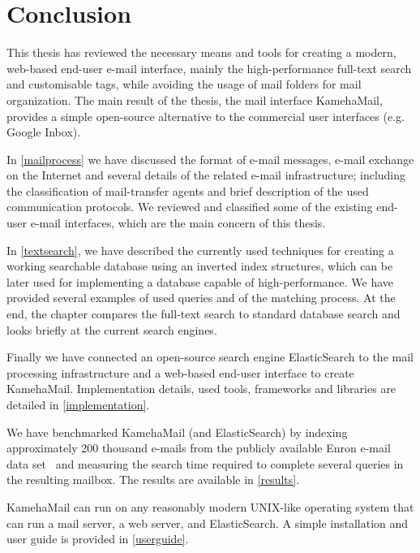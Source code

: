 \chapter*{Conclusion}
This thesis has reviewed the necessary means and tools for creating a modern, web-based end-user e-mail interface, mainly the high-performance full-text search and customisable tags, while avoiding the usage of mail folders for mail organization. The main result of the thesis, the mail interface KamehaMail, provides a simple open-source alternative to the commercial user interfaces (e.g. Google Inbox).

In \autoref{mailprocess} we have discussed the format of e-mail messages, e-mail exchange on the Internet and several details of the related e-mail infrastructure; including the classification of mail-transfer agents and brief description of the used communication protocols. We reviewed and classified some of the existing end-user e-mail interfaces, which are the main concern of this thesis.

In \autoref{textsearch}, we have described the currently used techniques for creating a working searchable database using an inverted index structures, which can be later used for implementing a database capable of high-performance. We have provided several examples of used queries and of the matching process. At the end, the chapter compares the full-text search to standard database search and looks briefly at the current search engines.

Finally we have connected an open-source search engine ElasticSearch to the mail processing infrastructure and a web-based end-user interface to create KamehaMail. Implementation details, used tools, frameworks and libraries are detailed in \autoref{implementation}. 

We have benchmarked KamehaMail (and ElasticSearch) by indexing approximately 200 thousand e-mails from the publicly available Enron e-mail data set~\cite{klimt2004enron} and measuring the search time required to complete several queries in the resulting mailbox. The results are available in \autoref{results}.

KamehaMail can run on any reasonably modern UNIX-like operating system that can run a mail server, a web server, and ElasticSearch. A simple installation and user guide is provided in \autoref{userguide}.

